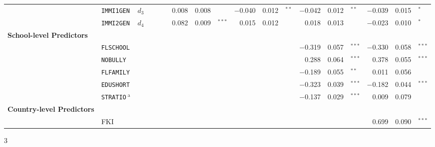 {\begin{tabular}{l @{\hskip -3.5cm} l c rr @{\hskip -0.1mm}l rr @{\hskip -0.1mm}l rr @{\hskip -0.1mm}l rr @{\hskip -0.1mm}l rr @{\hskip -0.1mm}l}
            & \texttt{IMMI1GEN} & $d_3$ &       &       &       & 0.008 & 0.008 &       & $-$0.040 & 0.012 & $^{**}$ & $-$0.042 & 0.012 & $^{**}$ & $-$0.039 & 0.015 & $^*$ \\
            & \texttt{IMMI2GEN} & $d_4$ &       &       &       & 0.082 & 0.009 & $^{***}$ & 0.015 & 0.012 &       & 0.018 & 0.013 &       & $-$0.023 & 0.010 & $^*$ \\
      \textbf{School-level Predictors} &&       &       &       &       &       &       &       &       &       &       &       &       &       &       &       &  \\
            & \texttt{FLSCHOOL} &&       &       &       &       &       &       &       &       &       & $-$0.319 & 0.057 & $^{***}$ & $-$0.330 & 0.058 & $^{***}$ \\
            & \texttt{NOBULLY} &&       &       &       &       &       &       &       &       &       & 0.288 & 0.064 & $^{***}$ & 0.378 & 0.055 & $^{***}$ \\
            & \texttt{FLFAMILY} &&       &       &       &       &       &       &       &       &       & $-$0.189 & 0.055 & $^{**}$ & 0.011 & 0.056 &  \\
            & \texttt{EDUSHORT} &&       &       &       &       &       &       &       &       &       & $-$0.323 & 0.039 & $^{***}$ & $-$0.182 & 0.044 & $^{***}$ \\
            & \texttt{STRATIO}$\ ^\text{a}$ &&       &       &       &       &       &       &       &       &       & $-$0.137 & 0.029 & $^{***}$ & 0.009 & 0.079 &  \\
      \textbf{Country-level Predictors} &&       &       &       &       &       &       &       &       &       &       &       &       &       &       &       &  \\
            & FKI   &&       &       &       &       &       &       &       &       &       &       &       &       & 0.699 & 0.090 & $^{***}$ \\
      \end{tabular}
}{3}
